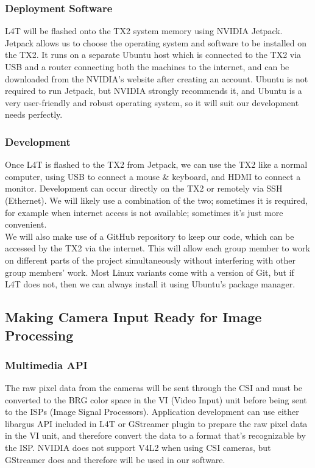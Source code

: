 \documentclass[letterpaper,10pt,serif,draftclsnofoot,onecolumn,compsoc,titlepage]{IEEEtran}
\begin{document}
\subsubsection{Deployment Software}

L4T will be flashed onto the TX2 system memory using NVIDIA Jetpack. Jetpack allows 
us to choose the operating system and software to be installed on the TX2. It runs on 
a separate Ubuntu host which is connected to the TX2 via USB and a router connecting 
both the machines to the internet, and can be downloaded from the NVIDIA’s website 
after creating an account. Ubuntu is not required to run Jetpack, but NVIDIA strongly 
recommends it, and Ubuntu is a very user-friendly and robust operating system, so it 
will suit our development needs perfectly. \\

\subsubsection{Development}

Once L4T is flashed to the TX2 from Jetpack, we can use the TX2 like a normal 
computer, using USB to connect a mouse \& keyboard, and HDMI to connect a monitor. 
Development can occur directly on the TX2 or remotely via SSH (Ethernet). We will 
likely use a combination of the two; sometimes it is required, for example when 
internet access is not available; sometimes it’s just more convenient. \\

We will also make use of a GitHub repository to keep our code, which can be accessed 
by the TX2 via the internet. This will allow each group member to work on different 
parts of the project simultaneously without interfering with other group members’ 
work. Most Linux variants come with a version of Git, but if L4T does not, then we 
can always install it using Ubuntu’s package manager. \\

\subsection{Making Camera Input Ready for Image Processing}

\subsubsection{Multimedia API}

The raw pixel data from the cameras will be sent through the CSI and must be converted 
to the BRG color space in the VI (Video Input) unit before being sent to the ISPs 
(Image Signal Processors). Application development can use either libargus API 
included in L4T or GStreamer plugin to prepare the raw pixel data in the VI unit, and 
therefore convert the data to a format that’s recognizable by the ISP. NVIDIA does not 
support V4L2 when using CSI cameras, but GStreamer does and therefore will be used in 
our software.  \\
\end{document}

